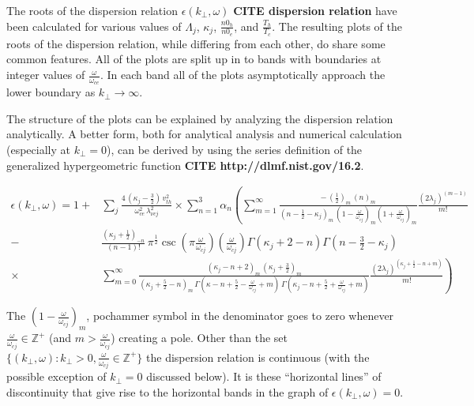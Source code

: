 \documentclass[12pt,a4paper]{article}
\begin{document}
    The roots of the dispersion relation $\epsilon(k_\perp, \omega)$ \textbf{CITE dispersion relation} have been calculated for various values of $\Lambda_j$, $\kappa_j$, $\frac{n0_h}{n0_e}$, and $\frac{T_h}{T_c}$.
    The resulting plots of the roots of the dispersion relation, while differing from each other, do share some common features.
    All of the plots are split up in to bands with boundaries at integer values of $\frac{\omega}{\omega_{ce}}$.
    In each band all of the plots asymptotically approach the lower boundary as $k_\perp \rightarrow \infty$.

    The structure of the plots can be explained by analyzing the dispersion relation analytically.
    A better form, both for analytical analysis and numerical calculation (especially at $k_\perp = 0$), can be derived by using the series definition of the generalized hypergeometric function \textbf{CITE http://dlmf.nist.gov/16.2}.

    \begin{align}
        \nonumber \epsilon(k_\perp, \omega) = 1 +& \sum_j \frac{4 \, (\kappa_j - \frac{3}{2}) \, v^2_{th}}{\omega^2_{ce} \, \lambda^2_{\nu c j}} \times \sum_{n = 1}^3 \alpha_n \left( \sum_{m = 1}^\infty \frac{ -\, (\frac{1}{2})_m \, (n)_m }{(n - \frac{1}{2} - \kappa_j)_m \, (1 - \frac{\omega}{\omega_{cj}})_m (1 + \frac{\omega}{\omega_{cj}})_m } \frac{(2 \lambda_j)^{(m - 1)}}{m!} \right. \\
        \nonumber -& \left. \frac{(\kappa_j + \frac{1}{2})_{-n}}{(n - 1)!} \, \pi^{\frac{1}{2}} \csc\left(\pi \frac{\omega}{\omega_{cj}}\right) \left(\frac{\omega}{\omega_{cj}}\right) \Gamma(\kappa_j + 2 - n) \Gamma(n - \frac{3}{2} - \kappa_j) \right.\\
        \times& \left. \sum_{m = 0}^\infty \frac{(\kappa_j - n + 2)_m \, (\kappa_j + \frac{3}{2})_m}{(\kappa_j + \frac{5}{2} - n)_m \, \Gamma(\kappa - n + \frac{5}{2} - \frac{\omega}{\omega_{cj}} + m) \, \Gamma(\kappa_j - n + \frac{5}{2} + \frac{\omega}{\omega_{cj}} + m)} \frac{(2 \lambda_j)^{(\kappa_j + \frac{1}{2} - n + m)}}{m!} \right)
    \end{align}

    The $(1 - \frac{\omega}{\omega_{cj}})_m$, pochammer symbol in the denominator goes to zero whenever $\frac{\omega}{\omega_{cj}} \in \mathbb{Z}^+$ (and $m > \frac{\omega}{\omega_{cj}}$) creating a pole.
    Other than the set $\{(k_\perp, \omega) : k_\perp > 0, \frac{\omega}{\omega_{cj}} \in \mathbb{Z}^+\}$ the dispersion relation is continuous (with the possible exception of $k_\perp = 0$ discussed below).
    It is these ``horizontal lines'' of discontinuity that give rise to the horizontal bands in the graph of $\epsilon(k_\perp, \omega) = 0$.
\end{document}
